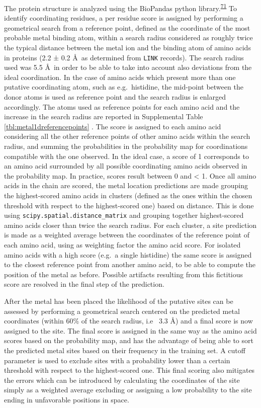 \documentclass[ lineno,
  9pt]{elife}
\begin{document}
The protein structure is analyzed using the BioPandas python library.\textsuperscript{\protect\hyperlink{ref-CcRTAd7h}{71}} To identify coordinating residues, a per residue score is assigned by performing a geometrical search from a reference point, defined as the coordinate of the most probable metal binding atom, within a search radius considered as roughly twice the typical distance between the metal ion and the binding atom of amino acids in proteins (2.2 ± 0.2 \AA\, as determined from \texttt{LINK} records). The search radius used was 5.5 \AA\, in order to be able to take into account also deviations from the ideal coordination. In the case of amino acids which present more than one putative coordinating atom, such as e.g.~histidine, the mid-point between the donor atoms is used as reference point and the search radius is enlarged accordingly. The atoms used as reference points for each amino acid and the increase in the search radius are reported in Supplemental Table \ref{tbl:metal1dreferencepoints} .
The score is assigned to each amino acid considering all the other reference points of other amino acids within the search radius, and summing the probabilities in the probability map for coordinations compatible with the one observed. In the ideal case, a score of 1 corresponds to an amino acid surrounded by all possible coordinating amino acids observed in the probability map. In practice, scores result between 0 and \textless{} 1. Once all amino acids in the chain are scored, the metal location predictions are made grouping the highest-scored amino acids in clusters (defined as the ones within the chosen threshold with respect to the highest-scored one) based on distance. This is done using \texttt{scipy.spatial.distance\_matrix} and grouping together highest-scored amino acids closer than twice the search radius. For each cluster, a site prediction is made as a weighted average between the coordinates of the reference point of each amino acid, using as weighting factor the amino acid score. For isolated amino acids with a high score (e.g.~a single histidine) the same score is assigned to the closest reference point from another amino acid, to be able to compute the position of the metal as before. Possible artifacts resulting from this fictitious score are resolved in the final step of the prediction.

After the metal has been placed the likelihood of the putative sites can be assessed by performing a geometrical search centered on the predicted metal coordinates (within 60\% of the search radius, i.e ~3.3 \AA ) and a final score is now assigned to the site. The final score is assigned in the same way as the amino acid scores based on the probability map, and has the advantage of being able to sort the predicted metal sites based on their frequency in the training set. A cutoff parameter is used to exclude sites with a probability lower than a certain threshold with respect to the highest-scored one. This final scoring also mitigates the errors which can be introduced by calculating the coordinates of the site simply as a weighted average excluding or assigning a low probability to the site ending in unfavorable positions in space.
\end{document}
